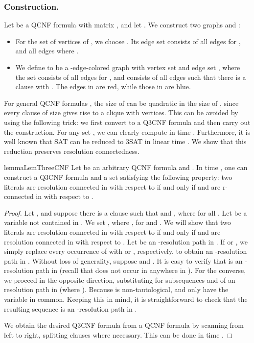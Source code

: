 \documentclass{llncs}
\newcommand{\longversion}[1]{#1}
\newcommand{\shortversion}[1]{}
\def\hy{\hbox{-}\nobreak\hskip0pt} \newcommand{\ellipsis}{}
\begin{document}
\subsubsection{Construction.}  Let  be a QCNF formula with matrix
, and let . We construct two graphs
 and :
\begin{itemize}
\item For the set of vertices of , we choose . Its edge set consists of all edges  for , and
  all edges  where .

\item We define  to be a \hy edge\hy colored graph with vertex
  set  and edge set , where the set  consists
  of all edges  for , and  consists of all edges
   such that there is a clause  with . The edges in  are red, while those in  are
  blue. \end{itemize}
For general QCNF formulas , the size of  can be quadratic
in the size of , since every clause of size  gives rise to a clique
with  vertices. This can be avoided by using the following trick: we first
convert  to a Q3CNF formula  and then carry out the
construction. For any set , we can clearly compute
 in time . Furthermore, it is well
known that SAT can be reduced to 3SAT in linear time
\cite{KleineBuningLettman99}. We show that this reduction preserves resolution
connectedness.
\begin{restatable}{lemma}{LemThreeCNF}\label{lem:3cnf}\shortversion{\textup{()}}
  Let  be an arbitrary QCNF formula and . In time , one can construct
  a Q3CNF formula  and a set 
  satisfying the following property: two literals 
  are resolution connected in  with respect to  if and only if 
  and  are r\hy connected in  with respect to .
\end{restatable}
\longversion{\begin{proof}
  Let , and suppose there is a
  clause  such that 
  and , where  for all . Let  be a variable not contained in . We set , where , for  and . We will show that two literals
   are resolution connected in  with respect
  to  if and only if  and  are
  resolution connected in  with respect to . Let \hskip 0pt be an \hy resolution path in . If  or , we
  simply replace every occurrence of  with  or , respectively, to
  obtain an \hy resolution path in . Without loss of
  generality, suppose  and . It is easy to verify that \hskip 0pt\hskip
  0pt is an \hy resolution path in
   (recall that  does not occur in anywhere in ). For the
  converse, we proceed in the opposite direction, substituting 
  for subsequences  and  of an \hy resolution path in  (where
  ). Because  is non\hy tautological,  and
   only have the variable  in common. Keeping this in mind, it is
  straightforward to check that the resulting sequence is an \hy resolution
  path in .

  We obtain the desired Q3CNF formula from a QCNF formula  by scanning
   from left to right, splitting clauses where necessary. This can be
  done in time .
\end{proof}
 }
\end{document}
